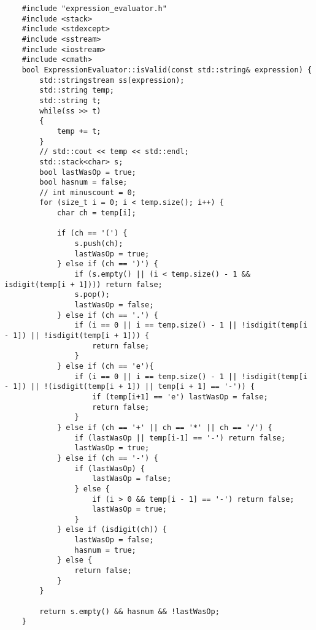 \documentclass[UTF8]{ctexart}
\begin{document}
\begin{lstlisting}
    #include "expression_evaluator.h"
    #include <stack>
    #include <stdexcept>
    #include <sstream>
    #include <iostream>
    #include <cmath>
    bool ExpressionEvaluator::isValid(const std::string& expression) {
        std::stringstream ss(expression);
        std::string temp;
        std::string t;
        while(ss >> t)
        {
            temp += t;
        }
        // std::cout << temp << std::endl;
        std::stack<char> s;
        bool lastWasOp = true;
        bool hasnum = false;
        // int minuscount = 0;
        for (size_t i = 0; i < temp.size(); i++) {
            char ch = temp[i];
            
            if (ch == '(') {
                s.push(ch);
                lastWasOp = true;
            } else if (ch == ')') {
                if (s.empty() || (i < temp.size() - 1 && isdigit(temp[i + 1]))) return false;
                s.pop();
                lastWasOp = false;
            } else if (ch == '.') {
                if (i == 0 || i == temp.size() - 1 || !isdigit(temp[i - 1]) || !isdigit(temp[i + 1])) {
                    return false;
                }
            } else if (ch == 'e'){
                if (i == 0 || i == temp.size() - 1 || !isdigit(temp[i - 1]) || !(isdigit(temp[i + 1]) || temp[i + 1] == '-')) {
                    if (temp[i+1] == 'e') lastWasOp = false;
                    return false;
                }
            } else if (ch == '+' || ch == '*' || ch == '/') {
                if (lastWasOp || temp[i-1] == '-') return false;
                lastWasOp = true;
            } else if (ch == '-') {
                if (lastWasOp) {
                    lastWasOp = false;
                } else {
                    if (i > 0 && temp[i - 1] == '-') return false;
                    lastWasOp = true;
                }
            } else if (isdigit(ch)) {
                lastWasOp = false;
                hasnum = true;
            } else {
                return false;
            }
        }
    
        return s.empty() && hasnum && !lastWasOp;
    }
    

\end{lstlisting}
\end{document}
